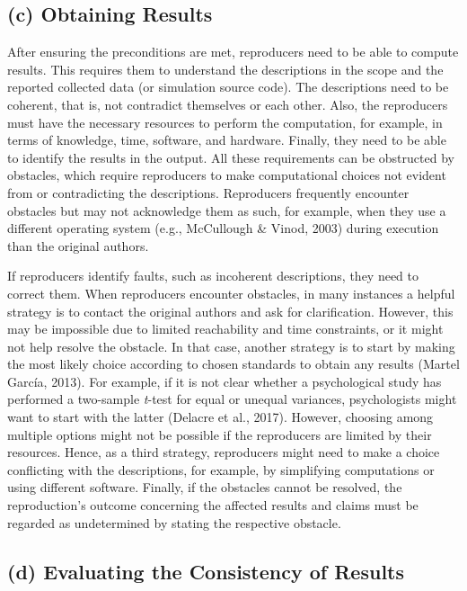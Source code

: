 \documentclass[authordate, meta]{jote-new-article}
\begin{document}
	\subsection{(c) Obtaining Results}



	After ensuring the preconditions are met, reproducers need to be able to compute results. This requires them to understand the descriptions in the scope and the reported collected data (or simulation source code). The descriptions need to be coherent, that is, not contradict themselves or each other. Also, the reproducers must have the necessary resources to perform the computation, for example, in terms of knowledge, time, software, and hardware. Finally, they need to be able to identify the results in the output. All these requirements can be obstructed by obstacles, which require reproducers to make computational choices not evident from or contradicting the descriptions. Reproducers frequently encounter obstacles but may not acknowledge them as such, for example, when they use a different operating system (e.g., McCullough \& Vinod, 2003) during execution than the original authors.



	If reproducers identify faults, such as incoherent descriptions, they need to correct them. When reproducers encounter obstacles, in many instances a helpful strategy is to contact the original authors and ask for clarification. However, this may be impossible due to limited reachability and time constraints, or it might not help resolve the obstacle. In that case, another strategy is to start by making the most likely choice according to chosen standards to obtain any results (Martel García, 2013). For example, if it is not clear whether a psychological study has performed a two-sample \emph{t}-test for equal or unequal variances, psychologists might want to start with the latter (Delacre et al., 2017). However, choosing among multiple options might not be possible if the reproducers are limited by their resources. Hence, as a third strategy, reproducers might need to make a choice conflicting with the descriptions, for example, by simplifying computations or using different software. Finally, if the obstacles cannot be resolved, the reproduction's outcome concerning the affected results and claims must be regarded as undetermined by stating the respective obstacle.



	\subsection{(d) Evaluating the Consistency of Results}
\end{document}
